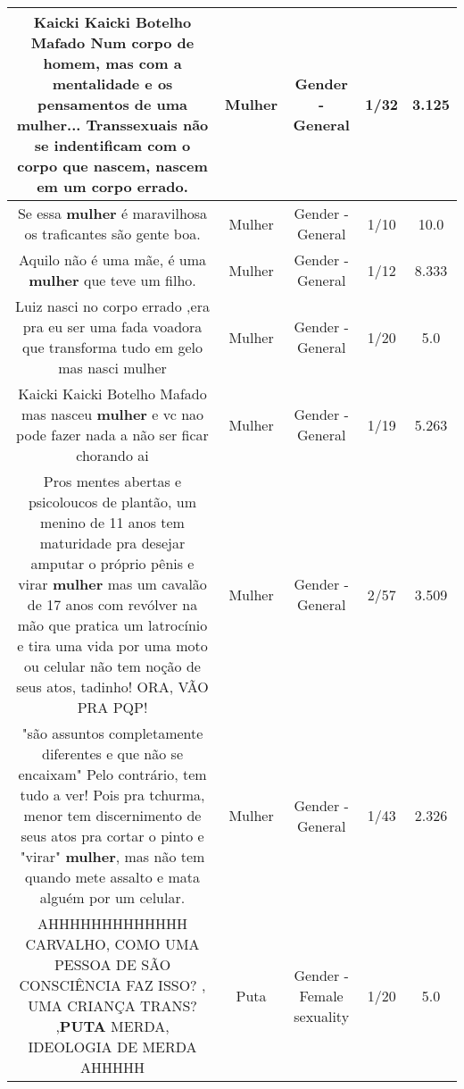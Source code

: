 \documentclass[11pt]{article}
\newlength\mylength
\begin{document}
\begin{center}
\begin{longtable}{|C{.65\mylength}|C{.30\mylength}|C{.12\mylength}|C{.12\mylength}|C{.12\mylength}|}
  \small Kaicki Kaicki Botelho Mafado Num corpo de homem, mas com a mentalidade e os pensamentos de uma \textbf{mulher}... Transsexuais não se indentificam com o corpo que nascem, nascem em um corpo errado.\normalsize   & Mulher & Gender - General & 1/32 & 3.125 \\  \hline
  \small Se essa \textbf{mulher} é maravilhosa os traficantes são gente boa.\normalsize   & Mulher & Gender - General & 1/10 & 10.0 \\  \hline
  \small Aquilo não é uma mãe, é uma \textbf{mulher} que teve um filho.\normalsize   & Mulher & Gender - General & 1/12 & 8.333 \\  \hline
  \small Luiz nasci no corpo errado ,era pra eu ser uma fada voadora que transforma tudo em gelo mas nasci mulher\normalsize   & Mulher & Gender - General & 1/20 & 5.0 \\  \hline
  \small Kaicki Kaicki Botelho Mafado mas nasceu \textbf{mulher} e vc nao pode fazer nada a não ser ficar chorando ai\normalsize   & Mulher & Gender - General & 1/19 & 5.263 \\  \hline
  \small Pros mentes abertas e psicoloucos de plantão, um menino de 11 anos tem maturidade pra desejar amputar o próprio pênis e virar \textbf{mulher} mas um cavalão de 17 anos com revólver na mão que pratica um latrocínio e tira uma vida por uma moto ou celular não tem noção de seus atos, tadinho! ORA, VÃO PRA PQP!\normalsize   & Mulher & Gender - General & 2/57 & 3.509 \\  \hline
  \small "são assuntos completamente diferentes e que não se encaixam" Pelo contrário, tem tudo a ver! Pois pra tchurma, menor tem discernimento de seus atos pra cortar o pinto e "virar" \textbf{mulher}, mas não tem quando mete assalto e mata alguém por um celular.\normalsize   & Mulher & Gender - General & 1/43 & 2.326 \\  \hline
  \small AHHHHHHHHHHHHH CARVALHO, COMO UMA PESSOA DE SÃO CONSCIÊNCIA FAZ ISSO? , UMA CRIANÇA TRANS? ,\textbf{PUTA} MERDA, IDEOLOGIA DE MERDA AHHHHH\normalsize   & Puta & Gender - Female sexuality & 1/20 & 5.0 \\  \hline

\end{longtable}
\end{center}
\end{document}
